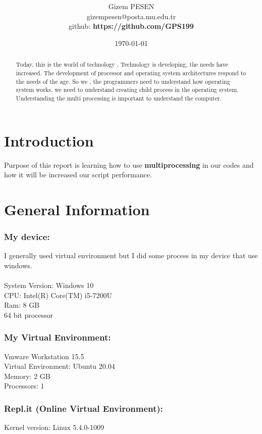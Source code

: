 \documentclass[onecolumn]{article}
\title{\spacecaps{Assignment Report 2: Child Process and Multiprocessing}\\ \normalsize \spacesc{CENG2034, Operating Systems} }
\author{Gizem PESEN\\gizempesen@posta.mu.edu.tr\\github: \textbf{https://github.com/GPS199}}
\date{\today}
\begin{document}
\maketitle

\begin{abstract}

Today, this is the world of technology . Technology is developing, the needs have increased. The development of processor and operating system architectures respond to the needs of the age. So  we , the programmers  need to understand how operating system works. we need to understand creating child process in the operating system. Understanding the multi processing is important to understand the computer. 
\end{abstract}


\section{Introduction}
Purpose of this report is learning how to use \textbf{multiprocessing} in our codes and how it will be increased our script performance.

\section{General Information}

\subsubsection{My device: }
I generally used virtual environment but I did some process in my device that use windows. \\ \\
System Version: Windows 10 \\
 CPU: Intel(R) Core(TM) i5-7200U  \\
 Ram: 8 GB  \\
 64 bit processor \\
 
\subsubsection{My Virtual Environment:  }
Vmware Workstation 15.5 \\ 
Virtual Environment: Ubuntu 20.04  \\  
Memory:  2 GB \\
Processors: 1 \\


\subsubsection{Repl.it (Online Virtual Environment):}
Kernel version: Linux 5.4.0-1009
 
\end{document}
